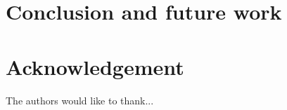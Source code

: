 \documentclass[conference]{IEEEtran}
\begin{document}




\section{Conclusion and future work}






\section*{Acknowledgement}


The authors would like to thank...






\end{document}
